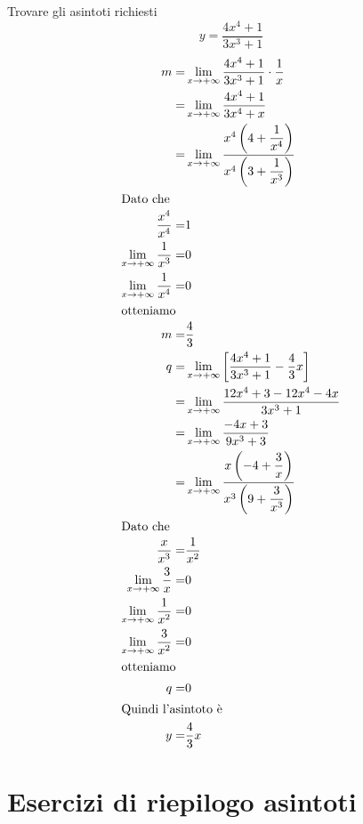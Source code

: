 \begin{exercise}
	Trovare gli asintoti richiesti
	\[y=\dfrac{4x^4+1}{3x^3+1}\]
	\tcblower
	\begin{align*}
	m=&\lim_{x\to +\infty}\dfrac{4x^4+1}{3x^3+1}\cdot\dfrac{1}{x}\\
	=&\lim_{x\to +\infty}\dfrac{4x^4+1}{3x^4+x}\\
	=&\lim_{x\to +\infty}\dfrac{x^4\left(4+\dfrac{1}{x^4}\right)}{x^4\left(3+\dfrac{1}{x^3}\right)}\\
	\intertext{Dato che}
	\dfrac{x^4}{x^4}=&1\\
	\lim_{x\to +\infty}\dfrac{1}{x^3}=&0\\
	\lim_{x\to +\infty}\dfrac{1}{x^4}=&0\\
	\intertext{otteniamo}
	m=&\dfrac{4}{3}\\
	q=&\lim_{x\to +\infty}\left[\dfrac{4x^4+1}{3x^3+1}-\dfrac{4}{3}x\right]\\
	=&\lim_{x\to +\infty}\dfrac{12x^4+3-12x^4-4x}{3x^3+1}\\
	=&\lim_{x\to +\infty}\dfrac{-4x+3}{9x^3+3}\\
	=&\lim_{x\to +\infty}\dfrac{x\left(-4+\dfrac{3}{x}\right)}{x^3\left(9+\dfrac{3}{x^3}\right)}\\
	\intertext{Dato che}
	\dfrac{x}{x^3}=&\dfrac{1}{x^2}\\
	\lim_{x\to +\infty}\dfrac{3}{x}=&0\\
	\lim_{x\to +\infty}\dfrac{1}{x^2}=&0\\
	\lim_{x\to +\infty}\dfrac{3}{x^2}=&0\\
	\intertext{otteniamo}
	q=&0\\
	\intertext{Quindi l'asintoto è}
	y=&\dfrac{4}{3}x
	\end{align*}
\end{exercise}
\section{Esercizi di riepilogo asintoti}
 
